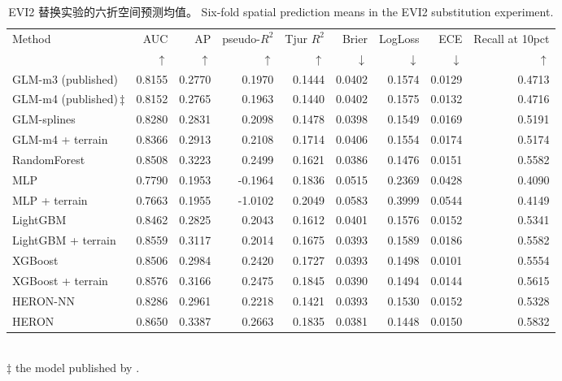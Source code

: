 \begin{table}[htbp]\centering\footnotesize
\caption{\ifzh
EVI2 替换实验的六折空间预测均值。
\else
Six-fold spatial prediction means in the EVI2 substitution experiment.
\fi}\label{tab:bench_evi2}
\begin{adjustbox}{max width=\linewidth}
\begin{tabular}{lrrrrrrrr}\toprule
Method & AUC & AP & pseudo-$R^2$ & Tjur $R^2$ & Brier & LogLoss & ECE & Recall at 10pct \\
& $\uparrow$ & $\uparrow$ & $\uparrow$ & $\uparrow$ & $\downarrow$ & $\downarrow$ & $\downarrow$ & $\uparrow$ \\ \midrule
GLM-m3 (published) & 0.8155 & 0.2770 & 0.1970 & 0.1444 & 0.0402 & 0.1574 & 0.0129 & 0.4713 \\
GLM-m4 (published)\,$\ddagger$ & 0.8152 & 0.2765 & 0.1963 & 0.1440 & 0.0402 & 0.1575 & 0.0132 & 0.4716 \\
GLM-splines & 0.8280 & 0.2831 & 0.2098 & 0.1478 & 0.0398 & 0.1549 & 0.0169 & 0.5191 \\
GLM-m4 + terrain & 0.8366 & 0.2913 & 0.2108 & 0.1714 & 0.0406 & 0.1554 & 0.0174 & 0.5174 \\
RandomForest & 0.8508 & 0.3223 & 0.2499 & 0.1621 & 0.0386 & 0.1476 & 0.0151 & 0.5582 \\
MLP & 0.7790 & 0.1953 & -0.1964 & 0.1836 & 0.0515 & 0.2369 & 0.0428 & 0.4090 \\
MLP + terrain & 0.7663 & 0.1955 & -1.0102 & 0.2049 & 0.0583 & 0.3999 & 0.0544 & 0.4149 \\
LightGBM & 0.8462 & 0.2825 & 0.2043 & 0.1612 & 0.0401 & 0.1576 & 0.0152 & 0.5341 \\
LightGBM + terrain & 0.8559 & 0.3117 & 0.2014 & 0.1675 & 0.0393 & 0.1589 & 0.0186 & 0.5582 \\
XGBoost & 0.8506 & 0.2984 & 0.2420 & 0.1727 & 0.0393 & 0.1498 & 0.0101 & 0.5554 \\
XGBoost + terrain & 0.8576 & 0.3166 & 0.2475 & 0.1845 & 0.0390 & 0.1494 & 0.0144 & 0.5615 \\
HERON-NN & 0.8286 & 0.2961 & 0.2218 & 0.1421 & 0.0393 & 0.1530 & 0.0152 & 0.5328 \\
HERON & 0.8650 & 0.3387 & 0.2663 & 0.1835 & 0.0381 & 0.1448 & 0.0150 & 0.5832 \\
\bottomrule\end{tabular}
\end{adjustbox}
\\[2pt]\footnotesize $\ddagger$ the model published by \cite{ortiz2026}.
\end{table}